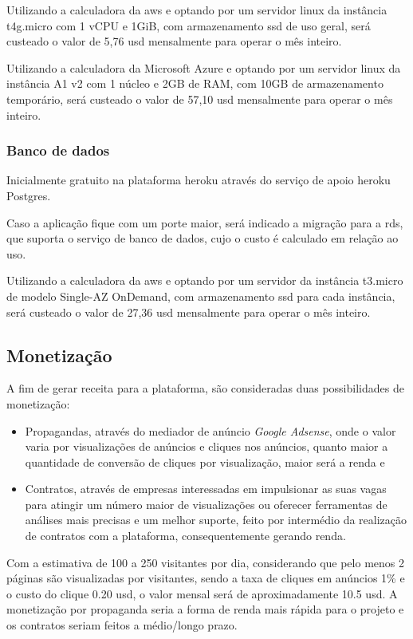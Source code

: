 Utilizando a calculadora da \gls{aws} \cite{aws_calc} e optando por um servidor \gls{linux} da instância
t4g.micro com 1 vCPU e 1GiB, com armazenamento \acs{ssd} de uso geral, será
custeado o valor de 5,76 \acs{usd} mensalmente para operar o mês inteiro.

Utilizando a calculadora da Microsoft Azure \cite{azure_calc} e optando por um servidor \gls{linux} da
instância A1 v2 com 1 núcleo e 2GB de RAM, com 10GB de armazenamento temporário, será 
custeado o valor de 57,10 \acs{usd} mensalmente para operar o mês inteiro.

\subsubsection{Banco de dados}
Inicialmente gratuito na plataforma \gls{heroku} através do serviço de apoio \gls{heroku} Postgres.

Caso a aplicação fique com um porte maior, será indicado a migração para a \gls{rds}, que suporta o serviço de banco de dados, cujo o custo é calculado em relação ao uso.

Utilizando a calculadora da \gls{aws} \cite{aws_calc} e optando por um servidor da instância t3.micro
de modelo Single-AZ OnDemand, com armazenamento \acs{ssd} para cada instância,
será custeado o valor de 27,36 \acs{usd} mensalmente para operar o mês inteiro.

\subsection{Monetização}
A fim de gerar receita para a plataforma, são consideradas duas possibilidades de monetização:

\begin{itemize}
    \item Propagandas, através do mediador de anúncio \emph{Google Adsense}, onde o valor varia por visualizações de anúncios e cliques nos anúncios, quanto maior a quantidade de conversão de cliques por visualização, maior será a renda e 
    \item Contratos, através de empresas interessadas em impulsionar as suas vagas para atingir um número maior de visualizações ou oferecer ferramentas de análises mais precisas e um melhor suporte, feito por intermédio da realização de contratos com a plataforma, consequentemente gerando renda.
\end{itemize}

Com a estimativa de 100 a 250 visitantes por dia, considerando que pelo menos 2 páginas são visualizadas por visitantes,
sendo a taxa de cliques em anúncios 1\% e o custo do clique 0.20 \acs{usd}, o valor mensal será de aproximadamente 10.5 \acs{usd}.
A monetização por propaganda seria a forma de renda mais rápida para o projeto e os contratos seriam feitos
a médio/longo prazo.

